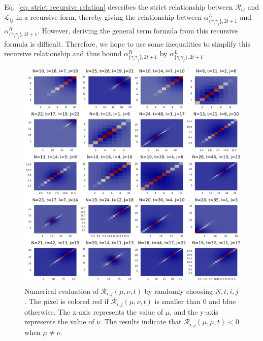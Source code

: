 \documentclass[showpacs,twocolumn,aps,prx,long bibliography,superscriptaddress,notitlepage]{revtex4-1}
\newcommand{\alpl}{\alpha_{\{\gamma_i\gamma_j\}, 2t+1}^{L}}
\newcommand{\alpr}{\alpha_{\{\gamma_i\gamma_j\}, 2t+1}^{R}}
\begin{document}
Eq.~\eqref{eq: strict recursive relation} describes the strict relationship between $\mathscr{R}_{ij}$ and $\mathscr{L}_{ij}$ in a recursive form, thereby giving the relationship between $\alpl$ and $\alpr$. However, deriving the general term formula from this recursive formula is difficult. Therefore, we hope to use some inequalities to simplify this recursive relationship and thus bound $\alpr$ by $\alpl$.


\begin{figure}[t]
    \centering
    \includegraphics[width=\linewidth]{assumption.pdf}
    \caption{ Numerical evaluation of  $\mathscr{R}_{i, j}(\mu, \nu, t)$ by randomly choosing $N, t, i, j$. The pixel is colored red if $\mathscr{R}_{i, j}(\mu, \nu, t)$ is smaller than 0 and blue otherwise. The x-axis represents the value of $\mu$, and the y-axis represents the value of $\nu$. The results indicate that $\mathscr{R}_{i, j}(\mu, \mu, t)<0$ when $\mu\neq\nu$.}
    \label{fig: appendix assumption}
\end{figure}
\end{document}
